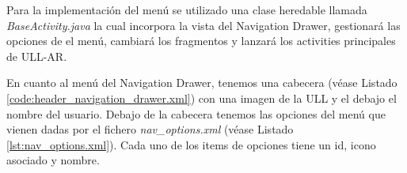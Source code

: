 

Para la implementación del menú se utilizado una clase heredable llamada \textit{BaseActivity.java} la cual incorpora la vista del Navigation Drawer, gestionará las opciones de el menú, cambiará los fragmentos y lanzará los activities principales de ULL-AR. 





En cuanto al menú del Navigation Drawer, tenemos una cabecera (véase Listado \ref{code:header_navigation_drawer.xml}) con una imagen de la ULL y el debajo el nombre del usuario. Debajo de la cabecera tenemos las opciones del menú que vienen dadas por el fichero \textit{nav\_options.xml} (véase Listado \ref{lst:nav_options.xml}). Cada uno de los items de opciones tiene un id, icono asociado y nombre.









